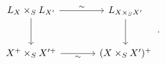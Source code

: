 \[
\begin{tikzcd}[column sep=large,row sep=large]
  L_X\times_S L_{X'}
    \arrow[r,"\sim"]
    \arrow[d]
  &
  L_{X\times_S X'}
    \arrow[d]
  \\
  X^+\times_S X'^{+}
    \arrow[r,"\sim"']
  &
  (X\times_S X')^+
\end{tikzcd}
\,.
\]
